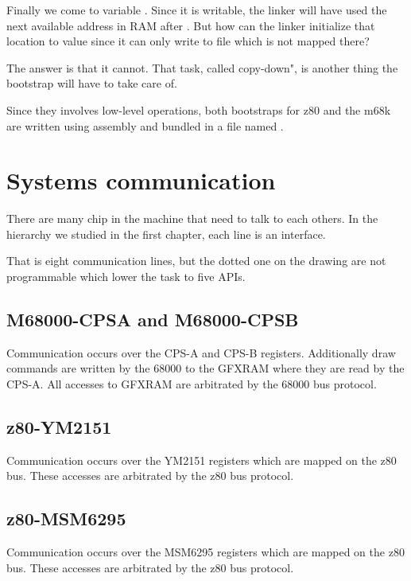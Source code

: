 Finally we come to variable . Since it is writable, the linker will have used the next available address in RAM after . But how can the linker initialize that location to value  since it can only write to file  which is not mapped there? 

The answer is that it cannot. That task, called copy-down", is another thing the bootstrap will have to take care of.

Since they involves low-level operations, both bootstraps for z80 and the m68k are written using assembly and bundled in a file named .





\section{Systems communication}

There are many chip in the machine that need to talk to each others. In the hierarchy we studied in the first chapter, each line is an interface. 


That is eight communication lines, but the dotted one on the drawing are not programmable which lower the task to five APIs.

\subsection{M68000-CPSA and M68000-CPSB} Communication occurs over the CPS-A and CPS-B registers. Additionally draw commands are written by the 68000 to the GFXRAM where they are read by the CPS-A. All accesses to GFXRAM are arbitrated by the 68000 bus protocol.

\subsection{z80-YM2151} Communication occurs over the YM2151 registers which are mapped on the z80 bus. These accesses are arbitrated by the z80 bus protocol.

\subsection{z80-MSM6295} Communication  occurs over the MSM6295 registers which are mapped on the z80 bus. These accesses are arbitrated by the z80 bus protocol. 

